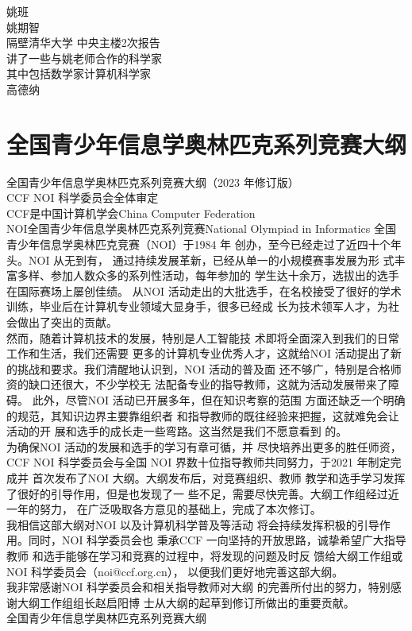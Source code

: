 \documentclass[12pt,twiside,a4paper]{ctexbook}
\numberwithin{chapter}{part}
\begin{document}
姚班\\
姚期智\\
隔壁清华大学 中央主楼2次报告\\
讲了一些与姚老师合作的科学家\\
其中包括数学家计算机科学家\\
高德纳

\chapter{全国青少年信息学奥林匹克系列竞赛大纲}
全国青少年信息学奥林匹克系列竞赛大纲（2023 年修订版）\\
CCF NOI 科学委员会全体审定\\
CCF是中国计算机学会China Computer Federation\\
NOI全国青少年信息学奥林匹克系列竞赛National Olympiad in Informatics
全国青少年信息学奥林匹克竞赛（NOI）于1984 年
创办，至今已经走过了近四十个年头。NOI 从无到有，
通过持续发展革新，已经从单一的小规模赛事发展为形
式丰富多样、参加人数众多的系列性活动，每年参加的
学生达十余万，选拔出的选手在国际赛场上屡创佳绩。
从NOI 活动走出的大批选手，在名校接受了很好的学术
训练，毕业后在计算机专业领域大显身手，很多已经成
长为技术领军人才，为社会做出了突出的贡献。\\
然而，随着计算机技术的发展，特别是人工智能技
术即将全面深入到我们的日常工作和生活，我们还需要
更多的计算机专业优秀人才，这就给NOI 活动提出了新
的挑战和要求。我们清醒地认识到，NOI 活动的普及面
还不够广，特别是合格师资的缺口还很大，不少学校无
法配备专业的指导教师，这就为活动发展带来了障碍。
此外，尽管NOI 活动已开展多年，但在知识考察的范围
方面还缺乏一个明确的规范，其知识边界主要靠组织者
和指导教师的既往经验来把握，这就难免会让活动的开
展和选手的成长走一些弯路。这当然是我们不愿意看到
的。\\
为确保NOI 活动的发展和选手的学习有章可循，并
尽快培养出更多的胜任师资，CCF NOI 科学委员会与全国
NOI 界数十位指导教师共同努力，于2021 年制定完成并
首次发布了NOI 大纲。大纲发布后，对竞赛组织、教师
教学和选手学习发挥了很好的引导作用，但是也发现了一
些不足，需要尽快完善。大纲工作组经过近一年的努力，
在广泛吸取各方意见的基础上，完成了本次修订。\\
我相信这部大纲对NOI 以及计算机科学普及等活动
将会持续发挥积极的引导作用。同时，NOI 科学委员会也
秉承CCF 一向坚持的开放思路，诚挚希望广大指导教师
和选手能够在学习和竞赛的过程中，将发现的问题及时反
馈给大纲工作组或NOI 科学委员会（noi@ccf.org.cn），
以便我们更好地完善这部大纲。\\
我非常感谢NOI 科学委员会和相关指导教师对大纲
的完善所付出的努力，特别感谢大纲工作组组长赵启阳博
士从大纲的起草到修订所做出的重要贡献。\\
全国青少年信息学奥林匹克系列竞赛大纲\\
\end{document}
